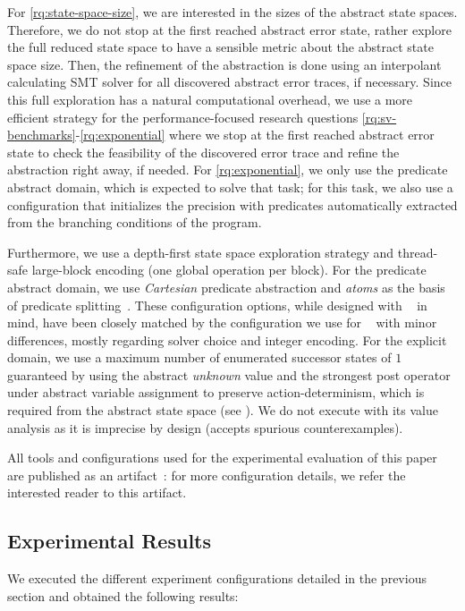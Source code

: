 \documentclass[numbook]{svjour3}
\begin{document}
For \ref{rq:state-space-size}, we are interested in the sizes of the abstract state spaces. Therefore, we do not stop at the first reached abstract error state, rather explore the full reduced state space to have a sensible metric about the abstract state space size. Then, the refinement of the abstraction is done using an interpolant calculating SMT solver for all discovered abstract error traces, if necessary. Since this full exploration has a natural computational overhead, we use a more efficient strategy for the performance-focused research questions \ref{rq:sv-benchmarks}-\ref{rq:exponential} where we stop at the first reached abstract error state to check the feasibility of the discovered error trace and refine the abstraction right away, if needed. For \ref{rq:exponential}, we only use the predicate abstract domain, which is expected to solve that task; for this task, we also use a configuration that initializes the precision with predicates automatically extracted from the branching conditions of the program.

Furthermore, we use a depth-first state space exploration strategy and thread-safe large-block encoding (one global operation per block). For the predicate abstract domain, we use \emph{Cartesian} predicate abstraction and \emph{atoms} as the basis of predicate splitting~\cite{theta-jar}. These configuration options, while designed with \Th~\cite{theta} in mind, have been closely matched by the configuration we use for \CPA~\cite{cpachecker} with minor differences, mostly regarding solver choice and integer encoding. For the explicit domain, we use a maximum number of enumerated successor states of $1$ guaranteed by using the abstract \emph{unknown} value and the strongest post operator under abstract variable assignment to preserve action-determinism, which is required from the abstract state space (see ). We do not execute \CPA with its value analysis as it is imprecise by design (accepts spurious counterexamples).

All tools and configurations used for the experimental evaluation of this paper are published as an artifact~\cite{artifact}: for more configuration details, we refer the interested reader to this artifact.

\subsection{Experimental Results}
\label{sec:por-results}

We executed the different experiment configurations detailed in the previous section and obtained the following results:
\end{document}
